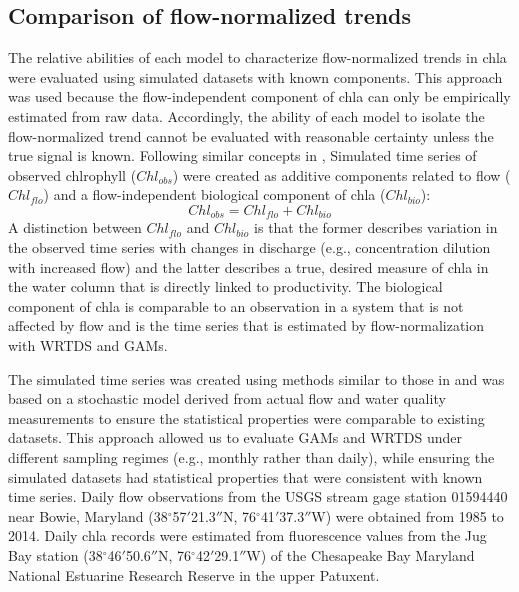 \documentclass{svjour3}\usepackage[]{graphicx}\usepackage[]{color}
\begin{document}
\subsection{Comparison of flow-normalized trends}

The relative abilities of each model to characterize flow-normalized trends in \ac{chla} were evaluated using simulated datasets with known components.  This approach was used because the flow-independent component of \ac{chla} can only be empirically estimated from raw data.  Accordingly, the ability of each model to isolate the flow-normalized trend cannot be evaluated with reasonable certainty unless the true signal is known.  Following similar concepts in \cite{Beck15b}, Simulated time series of observed chlrophyll ($Chl_{obs}$) were created as additive components related to flow ($Chl_{flo}$) and a flow-independent biological component of \ac{chla} ($Chl_{bio}$):
\begin{equation} \label{chlobs}
Chl_{obs} = Chl_{flo} + Chl_{bio}
\end{equation}
A distinction between $Chl_{flo}$ and $Chl_{bio}$ is that the former describes variation in the observed time series with changes in discharge (e.g., concentration dilution with increased flow) and the latter describes a true, desired measure of \ac{chla} in the water column that is directly linked to productivity.  The biological component of \ac{chla} is comparable to an observation in a system that is not affected by flow and is the time series that is estimated by flow-normalization with \ac{WRTDS} and \acp{GAM}.

The simulated time series was created using methods similar to those in \cite{Hirsch15} and was based on a stochastic model derived from actual flow and water quality measurements to ensure the statistical properties were comparable to existing datasets.  This approach allowed us to evaluate \acp{GAM} and \ac{WRTDS} under different sampling regimes (e.g., monthly rather than daily), while ensuring the simulated datasets had statistical properties that were consistent with known time series. Daily flow observations from the \ac{USGS} stream gage station 01594440 near Bowie, Maryland (38$^{\circ}$57$'$21.3$''$N, 76$^{\circ}$41$'$37.3$''$W) were obtained from 1985 to 2014.  Daily \ac{chla} records were estimated from fluorescence values from the Jug Bay station (38$^{\circ}$46$'$50.6$''$N, 76$^{\circ}$42$'$29.1$''$W) of the Chesapeake Bay Maryland National Estuarine Research Reserve in the upper Patuxent.
\end{document}
